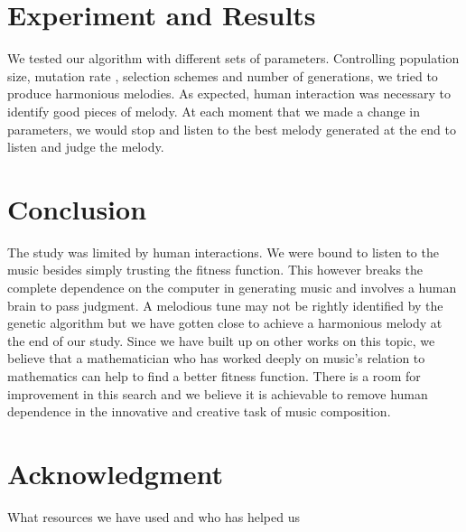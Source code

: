 \documentclass[conference]{IEEEtran}
\begin{document}
\section{Experiment and Results}
We tested our algorithm with different sets of parameters. Controlling population size, mutation rate , selection schemes and number of generations, we tried to produce harmonious melodies. As expected, human interaction was necessary to identify good pieces of melody. At each moment that we made a change in parameters, we would stop and listen to the best melody generated at the end to listen and judge the melody.

\section{Conclusion}
The study was limited by human interactions. We were bound to listen to the music besides simply trusting the fitness function. This however breaks the complete dependence on the computer in generating music and involves a human brain to pass judgment. A melodious tune may not be rightly identified by the genetic algorithm but we have gotten close to achieve a harmonious melody at the end of our study. Since we have built up on other works on this topic, we believe that a mathematician who has worked deeply on music's relation to mathematics can help to find a better fitness function. There is a room for improvement in this search and we believe it is achievable to remove human dependence in the innovative and creative task of music composition.

\section*{Acknowledgment}
What resources we have used and who has helped us
\end{document}
